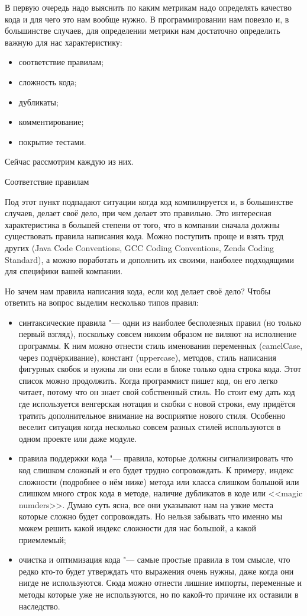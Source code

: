 \documentclass{../industrial-development}
\begin{document}
\lecturenotes

В первую очередь надо выяснить по каким метрикам надо определять качество кода и для чего это нам вообще нужно. В программировании нам повезло и, в большинстве случаев, для определении метрики нам достаточно определить важную для нас характеристику:
\begin{itemize}
	\item соответствие правилам;
	\item сложность кода;
	\item дубликаты;
	\item комментирование;
	\item покрытие тестами.
\end{itemize}

Сейчас рассмотрим каждую из них.

Соответствие правилам

Под этот пункт подпадают ситуации когда код компилируется и, в большинстве случаев, делает своё дело, при чем делает это правильно. Это интересная характеристика в большей степени от того, что в компании сначала должны существовать правила написания кода. Можно поступить проще и взять труд других (Java Code Conventions, GCC Coding Conventions, Zends Coding Standard), а можно поработать и дополнить их своими, наиболее подходящими для специфики вашей компании.

Но зачем нам правила написания кода, если код делает своё дело? Чтобы ответить на вопрос выделим несколько типов правил:
\begin{itemize}
	\item синтаксические правила "--- одни из наиболее бесполезных правил (но только первый взгляд), поскольку совсем никоим образом не виляют на исполнение программы. К ним можно отнести стиль именования переменных (camelCase, через подчёркивание), констант (uppercase), методов, стиль написания фигурных скобок и нужны ли они если в блоке только одна строка кода. Этот список можно продолжить. Когда программист пишет код, он его легко читает, потому что он знает свой собственный стиль. Но стоит ему дать код где используется венгерская нотация и скобки с новой строки, ему придётся тратить дополнительное внимание на восприятие нового стиля. Особенно веселит ситуация когда несколько совсем разных стилей используются в одном проекте или даже модуле.
	\item правила поддержки кода "--- правила, которые должны сигнализировать что код слишком сложный и его будет трудно сопровождать. К примеру, индекс сложности (подробнее о нём ниже) метода или класса слишком большой или слишком много строк кода в методе, наличие дубликатов в коде или <<magic numders>>. Думаю суть ясна, все они указывают нам на узкие места которые сложно будет сопровождать. Но нельзя забывать что именно мы можем решить какой индекс сложности для нас большой, а какой приемлемый;
	\item очистка и оптимизация кода "--- самые простые правила в том смысле, что редко кто-то будет утверждать что выражения очень нужны, даже когда они нигде не используются. Сюда можно отнести лишние импорты, переменные и методы которые уже не используются, но по какой-то причине их оставили в наследство.
\end{itemize}
\end{document}
